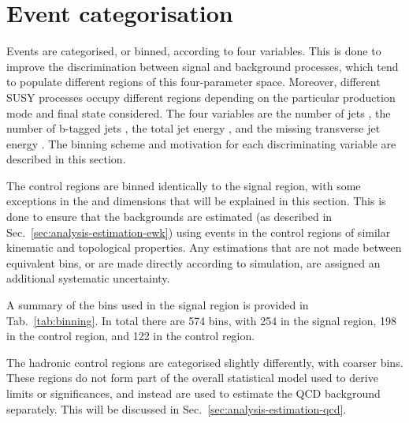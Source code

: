
\section{Event categorisation}
\label{sec:analysis-binning}

Events are categorised, or binned, according to four variables. This is done to 
improve the discrimination between signal and background processes, which tend 
to populate different regions of this four-parameter space. Moreover, different 
SUSY %
processes occupy different regions depending on the particular 
production mode and final state considered. The four variables are the number 
of jets \njet, the number of b-tagged jets \nb, the total jet energy \scalht, 
and the missing transverse jet energy \mht. The binning scheme and motivation 
for each discriminating variable are described in this section.

The control regions are binned identically to the signal region, with some 
exceptions in the \mht and \nb dimensions that will be explained in this 
section. This is done to ensure that the backgrounds are 
estimated (as described in Sec.~\ref{sec:analysis-estimation-ewk}) using events 
in the control regions of similar kinematic and topological properties. Any 
estimations that are not made between equivalent bins, or are made directly 
according to simulation, are assigned an additional systematic uncertainty.

A summary of the bins used in the signal region is provided in 
Tab.~\ref{tab:binning}.
In total there are 574 bins, with 254 in the signal region, 198 in the \mj 
control region, and 122 in the \mmj control region.

The hadronic control regions are categorised slightly differently, with coarser 
bins. These regions do not form part of the overall statistical model used to 
derive limits or significances, and instead are used to estimate the QCD 
background separately. This will be discussed in 
Sec.~\ref{sec:analysis-estimation-qcd}.


